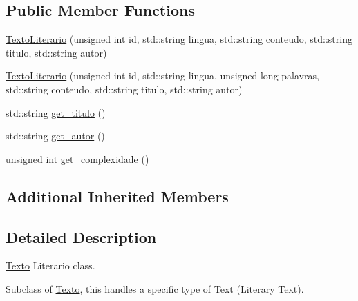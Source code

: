 \subsection*{Public Member Functions}
\begin{DoxyCompactItemize}
\item 
\hyperlink{class_texto_literario_addeb2b30770693455c5395a4a3fb941c}{Texto\-Literario} (unsigned int id, std\-::string lingua, std\-::string conteudo, std\-::string titulo, std\-::string autor)
\item 
\hyperlink{class_texto_literario_ac8484056631c263a653243b80065114b}{Texto\-Literario} (unsigned int id, std\-::string lingua, unsigned long palavras, std\-::string conteudo, std\-::string titulo, std\-::string autor)
\item 
std\-::string \hyperlink{class_texto_literario_adca504c785afdb9e77542b2bdca90a37}{get\-\_\-titulo} ()
\item 
std\-::string \hyperlink{class_texto_literario_acb31c6be6750cea439dde8636bf960ff}{get\-\_\-autor} ()
\item 
unsigned int \hyperlink{class_texto_literario_a7c09b8153bca93502a12fd7fbaa1e225}{get\-\_\-complexidade} ()
\end{DoxyCompactItemize}
\subsection*{Additional Inherited Members}


\subsection{Detailed Description}
\hyperlink{class_texto}{Texto} Literario class. 

Subclass of \hyperlink{class_texto}{Texto}, this handles a specific type of Text (Literary Text). 

